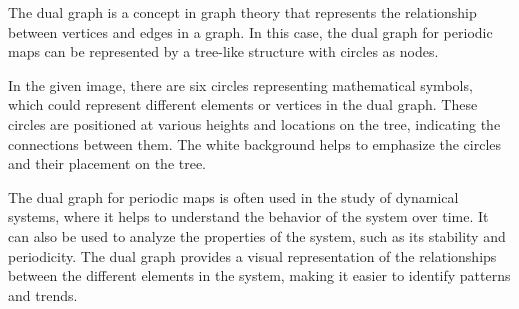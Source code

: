 The dual graph is a concept in graph theory that represents the relationship between vertices and edges in a graph. In this case, the dual graph for periodic maps can be represented by a tree-like structure with circles as nodes.

In the given image, there are six circles representing mathematical symbols, which could represent different elements or vertices in the dual graph. These circles are positioned at various heights and locations on the tree, indicating the connections between them. The white background helps to emphasize the circles and their placement on the tree.

The dual graph for periodic maps is often used in the study of dynamical systems, where it helps to understand the behavior of the system over time. It can also be used to analyze the properties of the system, such as its stability and periodicity. The dual graph provides a visual representation of the relationships between the different elements in the system, making it easier to identify patterns and trends.